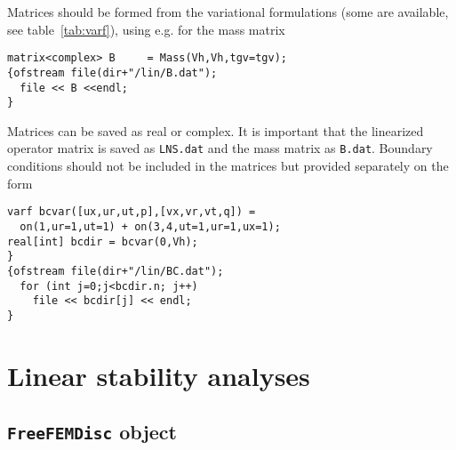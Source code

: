 \documentclass[12pts]{article}%
\begin{document}
Matrices should be formed from the variational formulations (some
are available, see table~\ref{tab:varf}), using e.g. for the mass
matrix
\begin{verbatim}
matrix<complex> B     = Mass(Vh,Vh,tgv=tgv);
{ofstream file(dir+"/lin/B.dat");
  file << B <<endl;
}
\end{verbatim}
Matrices can be saved as real or complex. It is important that the
linearized operator matrix is saved as \texttt{LNS.dat} and the mass
matrix as \texttt{B.dat}. Boundary conditions should not be included
in the matrices but provided separately on the form
\begin{verbatim}
varf bcvar([ux,ur,ut,p],[vx,vr,vt,q]) = 
  on(1,ur=1,ut=1) + on(3,4,ut=1,ur=1,ux=1);
real[int] bcdir	= bcvar(0,Vh); 
}
{ofstream file(dir+"/lin/BC.dat");
  for (int j=0;j<bcdir.n; j++)
    file << bcdir[j] << endl;
}
\end{verbatim}

\section{Linear stability analyses}

\subsection{\texttt{FreeFEMDisc} object}
\end{document}
